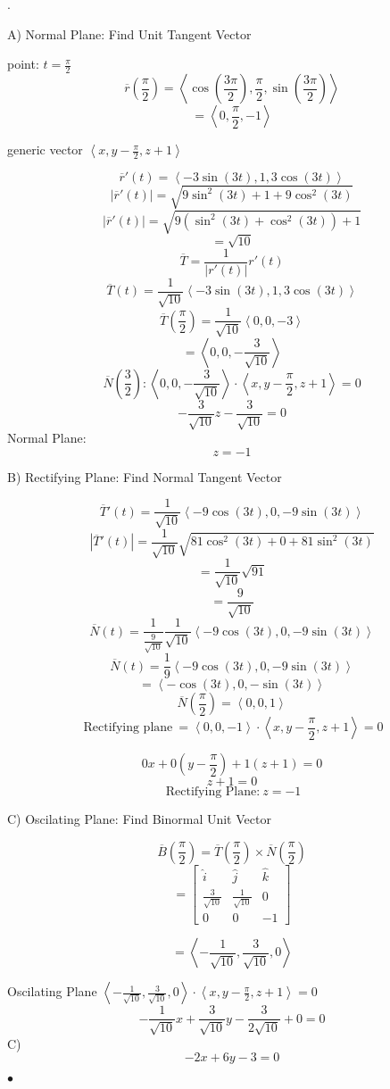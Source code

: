 \begin{solution}.

	A) Normal Plane: Find Unit Tangent Vector

	point: $t = \frac{\pi}{2}$
	\[\overline{r}(\frac{\pi}{2}) = \left<\cos(\frac{3\pi}{2}), \frac{\pi}{2}, \sin(\frac{3\pi}{2}) \right>\]
	\[= \left<0, \frac{\pi}{2}, -1 \right>\]

	generic vector $\left<x, y-\frac{\pi}{2}, z+1 \right>$

	\[\overline{r}'(t) = \left< -3 \sin (3t), 1, 3\cos(3t) \right>\]
	\[\left|  \overline{r}'(t) \right| = \sqrt{9\sin^2(3t) + 1 + 9\cos^2(3t)} \]
	\[\left|  \overline{r}'(t) \right| = \sqrt{9\left(  \sin^2(3t) + \cos^2(3t) \right)+ 1 } \]
	\[=\sqrt{10} \]
	\[\overline{T} = \frac{1}{\left| r'(t) \right| }r'(t)\]
	\[\overline{T}(t) = \frac{1}{\sqrt{10}} \left<-3\sin(3t), 1, 3 \cos(3t) \right>\]
	\[ \overline{T}(\frac{\pi}{2} )= \frac{1}{\sqrt{10} }\left<0, 0, -3 \right>\]
	\[= \left<0, 0, -\frac{3}{\sqrt{10} } \right>\]
	\[\overline{N}(\frac{3}{2}) :  \left< 0, 0, -\frac{3}{\sqrt{10} } \right> \cdot \left<x, y-\frac{\pi}{2}, z+1 \right> = 0\]
	\[ -\frac{3}{\sqrt{10}} z - \frac{3}{\sqrt{10}}= 0\]
	Normal Plane: \[\boxed{z = -1}\]

	B) Rectifying Plane: Find Normal Tangent Vector


	\[\overline{T}'(t) = \frac{1}{\sqrt{10}} \left<-9\cos(3t), 0, -9 \sin(3t) \right>\]
	\[\left| \overline{T}'(t) \right| = \frac{1}{\sqrt{10}}\sqrt{81\cos^2(3t) + 0 + 81\sin^2(3t)}\]
	\[ = \frac{1}{\sqrt{10} } \sqrt{91} \]
	\[ = \frac{9}{\sqrt{10} }\]
	\[\overline{N}(t) = \frac{1}{\frac{9}{\sqrt{10} }}\frac{1}{\sqrt{10}} \left<-9\cos(3t), 0, -9 \sin(3t) \right>\]
	\[\overline{N}(t) = \frac{1}{9} \left<-9\cos(3t), 0, -9\sin(3t) \right>  \]
	\[= \left<-\cos(3t), 0, -\sin(3t) \right>\]
	\[\overline{N}(\frac{\pi}{2}) = \left< 0, 0, 1 \right> \]
	\[\:\text{Rectifying plane}\: = \left<0, 0, -1 \right> \cdot \left<x, y-\frac{\pi}{2}, z+1 \right> = 0\]

	\[0x + 0(y-\frac{\pi}{2}) +1(z+1)= 0\]
	\[z + 1 = 0\]
	\[\:\text{Rectifying Plane:}\:\boxed{z = -1}\]

	C) Oscilating Plane: Find Binormal Unit Vector

	\[\overline{B}(\frac{\pi}{2}) = \overline{T}(\frac{\pi}{2}) \times  \overline{N}(\frac{\pi}{2})\]
	\[= \begin{bmatrix} \hat{i} & \hat{j} & \hat{k} \\
		\frac{3}{\sqrt{10}} & \frac{1}{\sqrt{10}} & 0 \\
		0 & 0 & -1 \end{bmatrix} \]

		\[= \left<-\frac{1}{\sqrt{10} }, \frac{3}{\sqrt{10} }, 0 \right>\]

		Oscilating Plane $ \left< -\frac{1}{\sqrt{10} }, \frac{3}{\sqrt{10} }, 0\right> \cdot
		\left< x, y-\frac{\pi}{2}, z+1 \right>= 0$
		\[-\frac{1}{\sqrt{10} }x + \frac{3}{\sqrt{10}} y - \frac{3}{2\sqrt{10}} + 0 = 0\]
		C) \[\boxed{-2x + 6y - 3 = 0}\]



\smallskip\hfill$\bullet$\end{solution}
